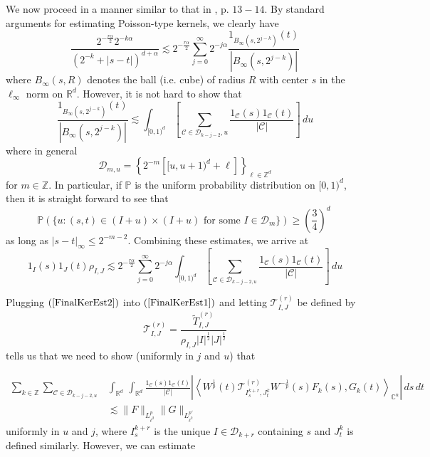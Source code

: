 \documentclass[12pt,reqno ]{amsart}
\numberwithin{equation}{section}
\theoremstyle{definition}
\newcommand{\C}{\ensuremath{\mathbb{C}^n}}
\newcommand{\Z}{\ensuremath{\mathbb{Z}}}
\newcommand{\Rd}{\ensuremath{\mathbb{R}^d}}
\newcommand{\D}{\ensuremath{\mathscr{D}}}
\newcommand{\ip}[2]{\ensuremath{\left\langle#1,#2\right\rangle}}
\newcommand{\W}[1]{\ensuremath{\widetilde{#1}}}
\newcommand{\MC}[1]{\ensuremath{\mathcal{#1}}}
\begin{document}
We now proceed in a manner similar to that in \cite{PTV}, p. $13 - 14$.  By standard arguments for estimating Poisson-type kernels, we clearly have \begin{equation*} \frac{ 2^{-\frac{r\alpha}{2}} 2^{-k\alpha} }{(2^{-k} + |s - t|)^{d + \alpha}} \lesssim 2^{-\frac{r\alpha}{2}} \sum_{j = 0}^\infty 2^{-j\alpha } \frac{1_{B_{\infty} (s, 2^{j - k})}(t) }{|B_{\infty}(s, 2^{j-k})|} \end{equation*} where $B_{\infty} (s, R)$ denotes the ball (i.e. cube) of radius $R$ with center $s$ in the $\ell_\infty$ norm on $\Rd$.  However, it is not hard to show that \begin{equation*} \frac{1_{B_{\infty} (s, 2^{j - k})} (t)}{|B_{\infty}(s, 2^{j-k})|} \lesssim \int_{[0, 1)^{d}} \left[\sum_{\MC{C} \in {\D}_{k - j - 2 }, u} \frac{1_{\MC{C}}(s) 1_{\MC{C}}(t)}{|\MC{C}|} \right] \, du   \end{equation*}  where in general  \begin{equation*} {\D}_{m, u} = \left\{ 2^{-m} \left[[u, u + 1)^d + \ell\right] \right\}_{\ell \in \Z^d} \end{equation*} for $m \in \Z$.  In particular, if $\mathbb{P}$ is the uniform probability distribution on $[0, 1)^d$, then it is straight forward to see that \begin{equation*} \mathbb{P} (\{u : (s, t) \in (I+u) \times (I+u) \text{ for some } I \in \D_m \}) \geq \left(\frac{3}{4}\right)^d \ \end{equation*} as long as $|s - t|_{\infty} \leq 2^{-m - 2}$. Combining these estimates, we arrive at \begin{equation} 1_I(s) 1_J(t) \rho_{I, J} \lesssim 2^{-\frac{r\alpha}{2}} \sum_{j = 0}^\infty 2^{-j\alpha} \int_{[0, 1)^d}  \left[ \sum_{\MC{C} \in {\D}_{k - j - 2, u}} \frac{1_{\MC{C}}(s) 1_{\MC{C}}(t)}{|\MC{C}|} \right] \, du \label{FinalKerEst2}\end{equation}

Plugging $(\ref{FinalKerEst2})$ into $(\ref{FinalKerEst1})$  and letting $\MC{T}_{I, J} ^{(r)}$ be defined by \begin{equation*} \MC{T}_{I, J} ^{(r)} = \frac{\W{T} ^{(r)}_{I, J}}{\rho_{I, J} |I|^\frac{1}{2} |J|^\frac{1}{2}} \end{equation*}  tells us that we need to show (uniformly in $j$ and $u$) that

\begin{align*}      \sum_{k \in \Z} \sum_{\MC{C} \in {\D}_{k - j - 2, u}} & \int_{\Rd} \, \int_{\Rd}   \frac{1_{\MC{C}}(s) 1_{\MC{C}}(t)}{|\MC{C}|} \left|\ip{ W^\frac{1}{p} (t) {\MC{T}}_{I_{s} ^{k+r}, J_t ^k} ^{(r)}  W^{-\frac{1}{p}} (s) F_{k }(s)}{G_{k} (t)}_{\C} \right|  \, ds \, dt  \\ & \lesssim  \|F\|_{L^p _{\ell^2}} \|G\|_{L^{p'} _{\ell^2}} \end{align*} uniformly in $u$ and $j$, where $I_{s} ^{k+r}$ is the unique $I \in \D_{k + r}$ containing $s$ and $J_t ^k$ is defined similarly.  However, we can estimate
\end{document}
